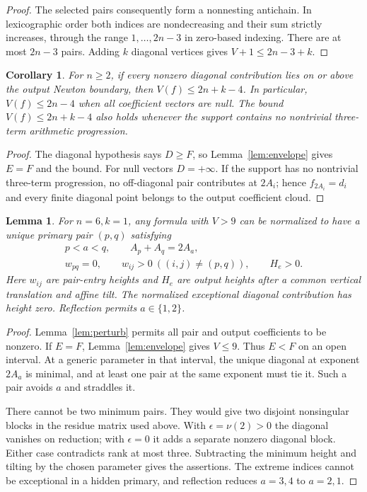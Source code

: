 \documentclass[11pt]{article}
\newtheorem{lemma}[theorem]{Lemma}
\newtheorem{corollary}[theorem]{Corollary}
\theoremstyle{remark}\newtheorem{remark}[theorem]{Remark}
\newcommand{\val}{\nu}
\begin{document}
\begin{proof}
The selected pairs consequently form a nonnesting antichain. In
lexicographic order both indices are nondecreasing and their sum
strictly increases, through the range $1,\ldots,2n-3$ in zero-based
indexing. There are at most $2n-3$ pairs. Adding $k$ diagonal vertices
gives $V+1\le2n-3+k$.
\end{proof}

\begin{corollary}\label{cor:visible-diagonals}
For $n\ge2$, if every nonzero diagonal contribution lies on or above
the output Newton boundary, then $V(f)\le2n+k-4$. In particular,
$V(f)\le2n-4$ when all coefficient vectors are null. The bound
$V(f)\le2n+k-4$ also holds whenever the support contains no nontrivial
three-term arithmetic progression.
\end{corollary}
\begin{proof}
The diagonal hypothesis says $D\ge F$, so Lemma~\ref{lem:envelope}
gives $E=F$ and the bound. For null vectors $D=+\infty$.
If the support has no nontrivial three-term progression, no
off-diagonal pair contributes at $2A_i$; hence $f_{2A_i}=d_i$ and
every finite diagonal point belongs to the output coefficient cloud.
\end{proof}

\begin{lemma}\label{lem:primary}
For $n=6,k=1$, any formula with $V>9$ can be normalized to have a
unique primary pair $(p,q)$ satisfying
\begin{gather*}
 p<a<q,\qquad A_p+A_q=2A_a,\\
 w_{pq}=0,\qquad w_{ij}>0\ ((i,j)\ne(p,q)),\qquad H_e>0.
\end{gather*}
Here $w_{ij}$ are pair-entry heights and $H_e$ are output heights
after a common vertical translation and affine tilt. The normalized
exceptional diagonal contribution has height zero. Reflection permits
$a\in\{1,2\}$.
\end{lemma}
\begin{proof}
Lemma~\ref{lem:perturb} permits all pair and output coefficients to be
nonzero. If $E=F$, Lemma~\ref{lem:envelope} gives $V\le9$. Thus $E<F$
on an open interval. At a generic parameter in that interval, the
unique diagonal at exponent $2A_a$ is minimal, and at least one pair
at the same exponent must tie it. Such a pair avoids $a$ and straddles it.

There cannot be two minimum pairs. They would give two disjoint
nonsingular blocks in the residue matrix used above. With
$\epsilon=\val(2)>0$ the diagonal vanishes on reduction; with
$\epsilon=0$ it adds a separate nonzero diagonal block. Either case
contradicts rank at most three. Subtracting the minimum height and
tilting by the chosen parameter gives the assertions. The extreme
indices cannot be exceptional in a hidden primary, and reflection
reduces $a=3,4$ to $a=2,1$.
\end{proof}
\end{document}
